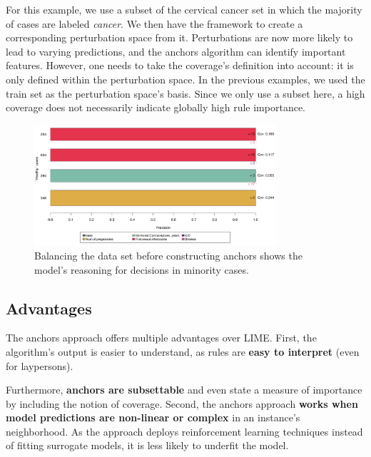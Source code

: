 \documentclass[
  10pt,
]{scrbook}
\begin{document}
For this example, we use a subset of the cervical cancer set in which the majority of cases are labeled \emph{cancer}. We then have the framework to create a corresponding perturbation space from it. Perturbations are now more likely to lead to varying predictions, and the anchors algorithm can identify important features. However, one needs to take the coverage's definition into account: it is only defined within the perturbation space. In the previous examples, we used the train set as the perturbation space's basis. Since we only use a subset here, a high coverage does not necessarily indicate globally high rule importance.

\begin{figure}

{\centering \includegraphics[width=0.8\textwidth]{images/unnamed-chunk-38-1} 

}

\caption{Balancing the data set before constructing anchors shows the model's reasoning for decisions in minority cases.}\label{fig:unnamed-chunk-38}
\end{figure}

\hypertarget{advantages-15}{%
\subsection{Advantages}\label{advantages-15}}

The anchors approach offers multiple advantages over LIME. First, the algorithm's output is easier to understand, as rules are \textbf{easy to interpret} (even for laypersons).

Furthermore, \textbf{anchors are subsettable} and even state a measure of importance by including the notion of coverage.
Second, the anchors approach \textbf{works when model predictions are non-linear or complex} in an instance's neighborhood. As the approach deploys reinforcement learning techniques instead of fitting surrogate models, it is less likely to underfit the model.
\end{document}
